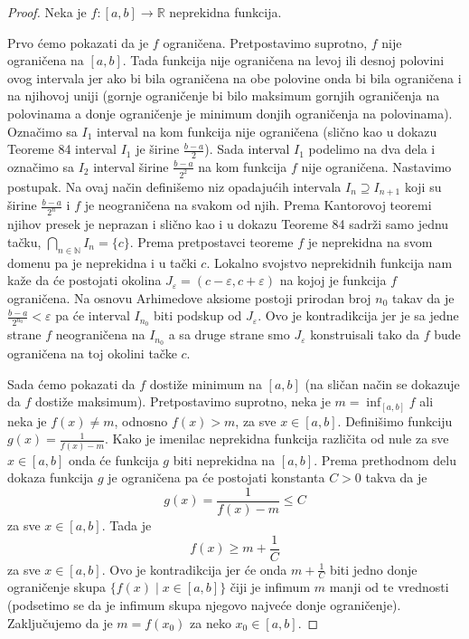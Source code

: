 \documentclass[a4paper,12pt]{article}
\theoremstyle{plain}
\theoremstyle{definition}
\theoremstyle{remark}
\begin{document}
\begin{proof}
Neka je $f : [a,b] \rightarrow \mathbb{R}$ neprekidna funkcija.

Prvo ćemo pokazati da je $f$ ograničena. Pretpostavimo suprotno, $f$ nije ograničena na $[a,b]$. Tada funkcija nije ograničena na levoj ili desnoj polovini ovog intervala jer ako bi bila ograničena na obe polovine onda bi bila ograničena i na njihovoj uniji (gornje ograničenje bi bilo maksimum gornjih ograničenja na polovinama a donje ograničenje je minimum donjih ograničenja na polovinama). Označimo sa $I_1$ interval na kom funkcija nije ograničena (slično kao u dokazu Teoreme 84 interval $I_1$ je širine $\frac{b-a}{2}$). Sada interval $I_1$ podelimo na dva dela i označimo sa $I_2$ interval širine $\frac{b-a}{2^2}$ na kom funkcija $f$ nije ograničena. Nastavimo postupak. Na ovaj način definišemo niz opadajućih intervala $I_n \supseteq I_{n+1}$ koji su širine $\frac{b-a}{2^n}$ i $f$ je neograničena na svakom od njih. Prema Kantorovoj teoremi njihov presek je neprazan i slično kao i u dokazu Teoreme 84 sadrži samo jednu tačku, $\bigcap_{n \in \mathbb{N}} I_n = \{c\}$. Prema pretpostavci teoreme $f$ je neprekidna na svom domenu pa je neprekidna i u tački $c$. Lokalno svojstvo neprekidnih funkcija nam kaže da će postojati okolina $J_\varepsilon = (c - \varepsilon, c + \varepsilon)$ na kojoj je funkcija $f$ ograničena. Na osnovu Arhimedove aksiome postoji prirodan broj $n_0$ takav da je $\frac{b-a}{2^{n_0}} < \varepsilon$ pa će interval $I_{n_0}$ biti podskup od $J_\varepsilon$. Ovo je kontradikcija jer je sa jedne strane $f$ neograničena na $I_{n_0}$ a sa druge strane smo $J_\varepsilon$ konstruisali tako da $f$ bude ograničena na toj okolini tačke $c$.

Sada ćemo pokazati da $f$ dostiže minimum na $[a,b]$ (na sličan način se dokazuje da $f$ dostiže maksimum). Pretpostavimo suprotno, neka je $m = \inf_{[a,b]} f$ ali neka je $f(x) \neq m$, odnosno $f(x) > m$, za sve $x \in [a,b]$. Definišimo funkciju $g(x) = \frac{1}{f(x) - m}$. Kako je imenilac neprekidna funkcija različita od nule za sve $x \in [a,b]$ onda će funkcija $g$ biti neprekidna na $[a,b]$. Prema prethodnom delu dokaza funkcija $g$ je ograničena pa će postojati konstanta $C > 0$ takva da je
$$g(x) = \frac{1}{f(x) - m} \le C$$
za sve $x \in [a,b]$. Tada je
$$f(x) \ge m + \frac{1}{C}$$
za sve $x \in [a,b]$. Ovo je kontradikcija jer će onda $m + \frac{1}{C}$ biti jedno donje ograničenje skupa $\{f(x) \mid x \in [a,b]\}$ čiji je infimum $m$ manji od te vrednosti (podsetimo se da je infimum skupa njegovo najveće donje ograničenje). Zaključujemo da je $m = f(x_0)$ za neko $x_0 \in [a,b]$.
\end{proof}
\end{document}
